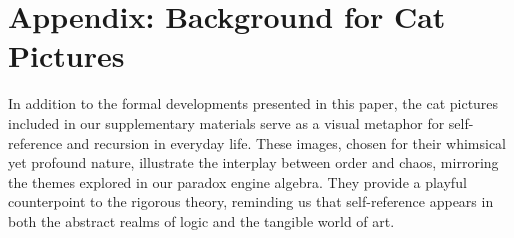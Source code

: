 \documentclass[12pt]{amsart}
\theoremstyle{plain}
\theoremstyle{definition}
\theoremstyle{remark}
\begin{document}
\section*{Appendix: Background for Cat Pictures}
In addition to the formal developments presented in this paper, the cat pictures included in our supplementary materials serve as a visual metaphor for self-reference and recursion in everyday life. These images, chosen for their whimsical yet profound nature, illustrate the interplay between order and chaos, mirroring the themes explored in our paradox engine algebra. They provide a playful counterpoint to the rigorous theory, reminding us that self-reference appears in both the abstract realms of logic and the tangible world of art.




\end{document}

